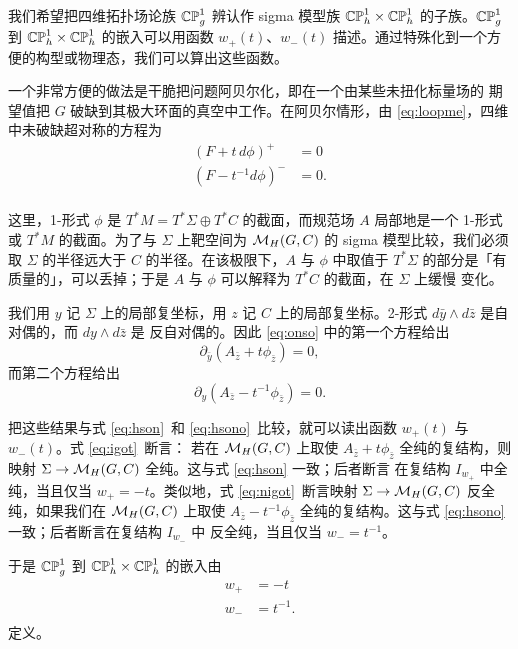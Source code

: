 我们希望把四维拓扑场论族 $\Bbb{CP}^1_g$ 辨认作 sigma 模型族
$\Bbb{CP}_h^1\times \Bbb{CP}_h^1$ 的子族。$\Bbb{CP}^1_g$
到 $\Bbb{CP}_h^1\times \Bbb{CP}_h^1$ 的嵌入可以用函数
$w_+(t)$、$w_-(t)$ 描述。通过特殊化到一个方便的构型或物理态，我们可以算出这些函数。

一个非常方便的做法是干脆把问题阿贝尔化，即在一个由某些未扭化标量场的
期望值把 $G$ 破缺到其极大环面的真空中工作。在阿贝尔情形，由 \eqref{eq:loopme}，四维中未破缺超对称的方程为
\setcounter{equation}{7}
\begin{equation}\label{eq:onso}
\begin{aligned}(F+t\,d\phi)^+&=0\\
(F-t^{-1}d\phi)^-&=0.\\
\end{aligned}
\end{equation}

这里，1-形式 $\phi$ 是 $T^*M=T^*\Sigma\oplus
T^*C$ 的截面，而规范场 $A$ 局部地是一个 1-形式或 $T^*M$ 的截面。为了与 $\Sigma$ 上靶空间为
$\MH(G,C)$ 的 sigma 模型比较，我们必须取 $\Sigma $ 的半径远大于
$C$ 的半径。在该极限下，$A$ 与 $\phi$ 中取值于
$T^*\Sigma$ 的部分是「有质量的」，可以丢掉；于是
$A$ 与 $\phi$ 可以解释为 $T^*C$ 的截面，在 $\Sigma$ 上缓慢
变化。

我们用 $y$ 记 $\Sigma$ 上的局部复坐标，用 $z$
记 $C$ 上的局部复坐标。2-形式 $d\bar
y\wedge d\bar z$ 是自对偶的，而 $dy\wedge d\bar z$ 是
反自对偶的。因此 \eqref{eq:onso} 中的第一个方程给出
\setcounter{equation}{8}
\begin{equation}\label{eq:igot}
\partial_{\bar y}\left(A_{\bar z}+t \phi_{\bar
z}\right)=0,
\end{equation}
 而第二个方程给出
\setcounter{equation}{9}
\begin{equation}\label{eq:nigot}
\partial_y\left(A_{\bar z}-t^{-1}\phi_{\bar
z}\right)=0.
\end{equation}

把这些结果与式 \eqref{eq:hson}\ 和 \eqref{eq:hsono}\ 比较，就可以读出函数 $w_+(t)$ 与 $w_-(t)$。式 \eqref{eq:igot}\ 断言：
若在 $\MH(G,C)$ 上取使 $A_{\bar z}+t\phi_{\bar
z}$ 全纯的复结构，则映射 $\Sigma\to \MH(G,C)$ 全纯。这与式 \eqref{eq:hson} 一致；后者断言
在复结构 $I_{w_+}$ 中全纯，当且仅当
$w_+=-t$。类似地，式 \eqref{eq:nigot}\ 断言映射 $\Sigma\to
\MH(G,C)$ 反全纯，如果我们在 $\MH(G,C)$ 上取使 $A_{\bar z}-t^{-1} \phi_{\bar z}$
全纯的复结构。这与式 \eqref{eq:hsono} 一致；后者断言在复结构 $I_{w_-}$ 中
反全纯，当且仅当
$w_-=t^{-1}$。

于是 $\Bbb{CP}^1_g$ 到 $\Bbb{CP}_h^1\times
\Bbb{CP}_h^1$ 的嵌入由 %
\setcounter{equation}{10}
\begin{equation}\label{eq:tyroy}
\begin{aligned}w_+ & = -t\\
                                              w_- & = t^{-1}.\\
\end{aligned}
\end{equation}
定义。

